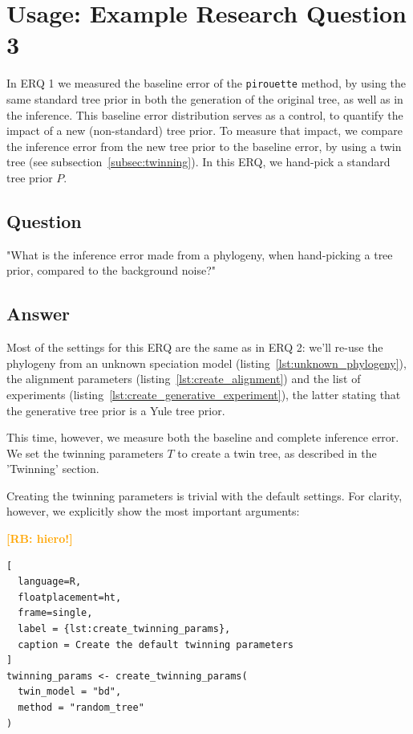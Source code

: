 \documentclass{article}
\newcommand{\richel}[1]{\textcolor{orange}{\textbf{[RB: #1]}}}
\begin{document}
\section{Usage: Example Research Question 3}

In ERQ 1 we measured the baseline error of the \verb;pirouette; method,
by using the same standard tree prior in both the generation of 
the original tree, as well as in the inference.
This baseline error distribution serves as a control,
to quantify the impact of a new (non-standard) tree prior.
To measure that impact, we compare the inference error 
from the new tree prior to the baseline error,
by using a twin tree (see subsection~\ref{subsec:twinning}).
In this ERQ, we hand-pick a standard tree prior $\mathit{P}$.

\subsection{Question}

"What is the inference error made from a phylogeny, 
when hand-picking a tree prior, compared to the background noise?"

\subsection{Answer}

Most of the settings for this ERQ are
the same as in ERQ 2: we'll re-use the phylogeny from an 
unknown speciation model (listing~\ref{lst:unknown_phylogeny}), 
the alignment parameters (listing~\ref{lst:create_alignment})
and the list of experiments (listing~\ref{lst:create_generative_experiment}),
the latter stating that the generative tree prior is a Yule tree prior.

This time, however, we measure both the baseline and complete inference error.
We set the twinning parameters $\mathit{T}$ to create a twin tree,
as described in the 'Twinning' section.

Creating the twinning parameters is trivial with the default settings.
For clarity, however, we explicitly show the most
important arguments:

\richel{hiero!}

\begin{lstlisting}[
  language=R, 
  floatplacement=ht, 
  frame=single,
  label = {lst:create_twinning_params},
  caption = Create the default twinning parameters
]
twinning_params <- create_twinning_params(
  twin_model = "bd", 
  method = "random_tree"
)
\end{lstlisting}
\end{document}
